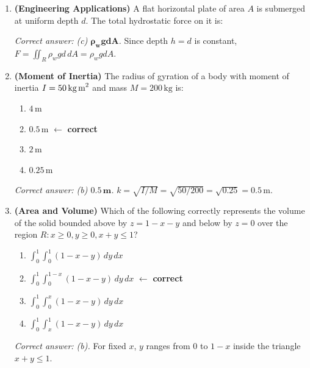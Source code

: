 \documentclass[12pt,a4paper]{article}
\begin{document}
\begin{enumerate}[label=\textbf{MCQ\arabic*.}]
  \item \textbf{(Engineering Applications)} A flat horizontal plate of area \(A\) is submerged at uniform depth \(d\). The total hydrostatic force on it is:
  \textit{Correct answer: (c) \(\mathbf{\rho_w g d A}\).} Since depth \(h = d\) is constant, \(F = \iint_R \rho_w g d\,dA = \rho_w g d A\).

  \item \textbf{(Moment of Inertia)} The radius of gyration of a body with moment of inertia \(I = 50\,\text{kg\,m}^2\) and mass \(M = 200\,\text{kg}\) is:
  \begin{enumerate}[label=(\alph*)]
    \item \(4\,\text{m}\)
    \item \(0.5\,\text{m}\)  \quad \(\leftarrow\) \textbf{correct}
    \item \(2\,\text{m}\)
    \item \(0.25\,\text{m}\)
  \end{enumerate}
  \textit{Correct answer: (b) \(\mathbf{0.5\,\text{m}}\).} \(k = \sqrt{I/M} = \sqrt{50/200} = \sqrt{0.25} = 0.5\,\text{m}\).

  \item \textbf{(Area and Volume)} Which of the following correctly represents the volume of the solid bounded above by \(z = 1 - x - y\) and below by \(z = 0\) over the region \(R: x \geq 0, y \geq 0, x+y \leq 1\)?
  \begin{enumerate}[label=(\alph*)]
    \item \(\int_0^1\int_0^1 (1-x-y)\,dy\,dx\)
    \item \(\int_0^1\int_0^{1-x}(1-x-y)\,dy\,dx\)  \quad \(\leftarrow\) \textbf{correct}
    \item \(\int_0^1\int_0^{x}(1-x-y)\,dy\,dx\)
    \item \(\int_0^1\int_x^1 (1-x-y)\,dy\,dx\)
  \end{enumerate}
  \textit{Correct answer: (b).} For fixed \(x\), \(y\) ranges from \(0\) to \(1-x\) inside the triangle \(x+y \leq 1\).

\end{enumerate}
\end{document}
